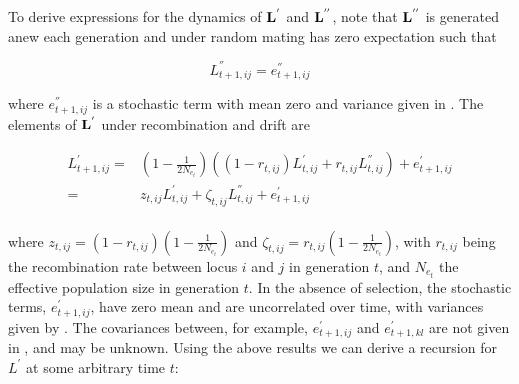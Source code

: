 \documentclass[12pt]{article}
\begin{document}
\begin{bibunit}
To derive expressions for the dynamics of ${\bf L}^{'}$ and ${\bf L}^{''}$, note that ${\bf L}^{''}$ is generated anew each generation and under random mating has zero expectation such that

\begin{equation}
L^{''}_{{t+1},i j} = e^{''}_{{t+1},ij}
\end{equation}

where $e^{''}_{{t+1},ij}$ is a stochastic term with mean zero and variance given in \citet{Weir.1996}. The elements of ${\bf L}^{'}$ under recombination and drift are \citep{Hill.1968, Santiago.1998}

\begin{equation}
\begin{array}{rl}
L^{'}_{{t+1},ij} =& \left(1-\frac{1}{2N_{e_t}}
\right)\left((1-r_{t,ij})L^{'}_{t,ij} + r_{t,ij}L^{''}_{t,ij}\right)+e^{'}_{{t+1},ij}\\
=& z_{t,ij}L^{'}_{t,ij} + \zeta_{t,ij}L^{''}_{t,ij}+e^{'}_{{t+1},ij}\\
\end{array}
\end{equation}

where $z_{{t},ij}=(1-r_{{t},ij})(1-\frac{1}{2N_{e_t}})$ and  $\zeta_{{t},ij}=r_{{t},ij}(1-\frac{1}{2N_{e_t}})$, with $r_{{t},ij}$ being the recombination rate between locus $i$ and $j$ in generation $t$, and $N_{e_t}$ the effective population size in generation $t$. In the absence of selection, the stochastic terms, $e^{'}_{{t+1},ij}$, have zero mean and are uncorrelated over time, with variances given by \citet[][Eq 25, although those variances must be divided by 4 here since we are working with the frequency of alleles in individuals rather than gametes]{Ohta.1969}. The covariances between, for example, $e^{'}_{{t+1},ij}$ and $e^{'}_{{t+1},kl}$ are not given in \citet{Ohta.1969}, and may be unknown. Using the above results we can derive a recursion for $L^{'}$ at some arbitrary time $t$:


\end{bibunit}
\end{document}
